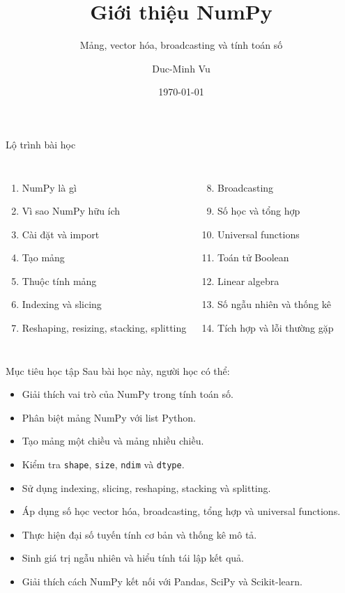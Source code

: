 \documentclass[aspectratio=169,11pt]{beamer}
\title[Giới thiệu NumPy]{Giới thiệu NumPy}
\subtitle{Mảng, vector hóa, broadcasting và tính toán số}
\author{Duc-Minh Vu}
\institute{SLSCM Lab -- FDA -- NEU}
\date{\today}
\begin{document}
\begin{frame}
  \titlepage
\end{frame}

\begin{frame}{Lộ trình bài học}
\begin{columns}[T]
\begin{enumerate}
  \item NumPy là gì
  \item Vì sao NumPy hữu ích
  \item Cài đặt và import
  \item Tạo mảng
  \item Thuộc tính mảng
  \item Indexing và slicing
  \item Reshaping, resizing, stacking, splitting
\end{enumerate}
\begin{enumerate}
  \setcounter{enumi}{7}
  \item Broadcasting
  \item Số học và tổng hợp
  \item Universal functions
  \item Toán tử Boolean
  \item Linear algebra
  \item Số ngẫu nhiên và thống kê
  \item Tích hợp và lỗi thường gặp
\end{enumerate}
\end{columns}
\end{frame}

\begin{frame}{Mục tiêu học tập}
\small
Sau bài học này, người học có thể:
\begin{itemize}
  \item Giải thích vai trò của NumPy trong tính toán số.
  \item Phân biệt mảng NumPy với list Python.
  \item Tạo mảng một chiều và mảng nhiều chiều.
  \item Kiểm tra \texttt{shape}, \texttt{size}, \texttt{ndim} và \texttt{dtype}.
  \item Sử dụng indexing, slicing, reshaping, stacking và splitting.
  \item Áp dụng số học vector hóa, broadcasting, tổng hợp và universal functions.
  \item Thực hiện đại số tuyến tính cơ bản và thống kê mô tả.
  \item Sinh giá trị ngẫu nhiên và hiểu tính tái lập kết quả.
  \item Giải thích cách NumPy kết nối với Pandas, SciPy và Scikit-learn.
\end{itemize}
\end{frame}
\end{document}
